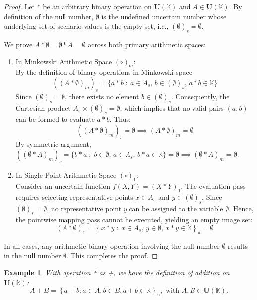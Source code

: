 \documentclass[a4paper,12pt,twoside]{memoir}
\newtheorem{example}{Example}[chapter]
\newcommand{\set}[1]{\left\{#1\right\}} %
\newcommand{\s}[1]{\set{#1}_\mathrm{u}} %
\newcommand{\tsbd}[1]{\mathbf{U}(\mathbb{#1})}
\newcommand{\kgdd}[1]{\left(#1\right)_1} %
\begin{document}
	\begin{proof}
		Let $*$ be an arbitrary binary operation on $\tsbd{K}$ and $A \in \tsbd{K}$. By definition of the null number, $\emptyset$ is the undefined uncertain number whose underlying set of scenario values is the empty set, i.e., $(\emptyset)_s = \emptyset$.
		
		We prove $A * \emptyset = \emptyset * A = \emptyset$ across both primary arithmetic spaces:
		
		\begin{enumerate}[leftmargin=*]
			\item In Minkowski Arithmetic Space $(\circ)_m$: \\
			By the definition of binary operations in Minkowski space:
			\[
			((A * \emptyset)_m)_s = \{a * b \;:\; a \in A_s, \, b \in (\emptyset)_s, \, a * b \in \mathbb{K}\}
			\]
			Since $(\emptyset)_s = \emptyset$, there exists no element $b \in (\emptyset)_s$. Consequently, the Cartesian product $A_s \times (\emptyset)_s = \emptyset$, which implies that no valid pairs $(a, b)$ can be formed to evaluate $a * b$. Thus:
			\[
			((A * \emptyset)_m)_s = \emptyset \implies (A * \emptyset)_m = \emptyset
			\]
			By symmetric argument, $((\emptyset * A)_m)_s = \{b * a \;:\; b \in \emptyset, \, a \in A_s, \, b * a \in \mathbb{K}\} = \emptyset \implies (\emptyset * A)_m = \emptyset$.
			
			\item In Single-Point Arithmetic Space $(\circ)_1$: \\
			Consider an uncertain function $f(X, Y) = \kgdd{X * Y}$. The evaluation pass requires selecting representative points $x \in A_s$ and $y \in (\emptyset)_s$. Since $(\emptyset)_s = \emptyset$, no representative point $y$ can be assigned to the variable $\emptyset$. Hence, the pointwise mapping pass cannot be executed, yielding an empty image set:
			\[
			\kgdd{A * \emptyset} = \s{x * y \;:\; x \in A_s, \, y \in \emptyset, \, x * y \in \mathbb{K}} = \emptyset
			\]
		\end{enumerate}
		
		In all cases, any arithmetic binary operation involving the null number $\emptyset$ results in the null number $\emptyset$. This completes the proof.
	\end{proof}
	\begin{example}
		With operation * as +, we have the definition of addition on $\tsbd{K}$:
		$$A + B = \s{a+b : a \in A , b \in B, a+b \in \mathbb{K}}, \text{ with } A,B \in \tsbd{K}.$$
	\end{example}
	
\end{document}
